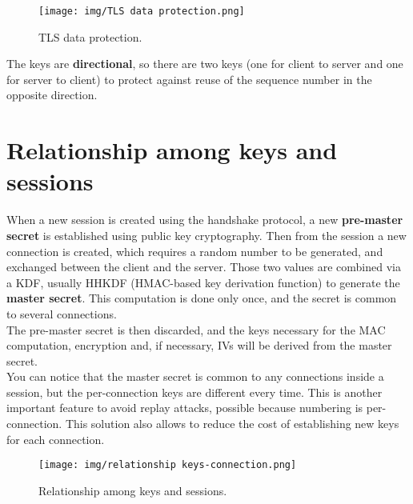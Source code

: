 \begin{figure}[h]
  \centering
  \texttt{[image: img/TLS data protection.png]}
  \caption{TLS data protection.}
  \label{fig:tls-data-protection}
\end{figure}

The keys are \textbf{directional}, so there are two keys (one for
client to server and one for server to client) to protect against
reuse of the sequence number in the opposite direction.

\section{Relationship among keys and sessions}
When a new session is created using the handshake protocol, a new
\textbf{pre-master secret} is established using public key
cryptography. Then from the session a new connection is created, which
requires a random number to be generated, and exchanged between the
client and the server. Those two values are combined via a KDF,
usually HHKDF (HMAC-based key derivation function) to generate the 
\textbf{master secret}. This computation is done only once, and the 
secret is common to several connections.\\
The pre-master secret is then discarded, and the keys necessary for
the MAC computation, encryption and, if necessary, IVs will be derived
from the master secret.\\
You can notice that the master secret is common to any connections
inside a session, but the per-connection keys are different every
time. This is another important feature to avoid replay attacks,
possible because numbering is per-connection. This solution also
allows to reduce the cost of establishing new keys for each
connection.

\begin{figure}[H]
  \centering
  \texttt{[image: img/relationship
  keys-connection.png]}
  \caption{Relationship among keys and sessions.}
  \label{fig:tls-keys-and-sessions}
\end{figure}

